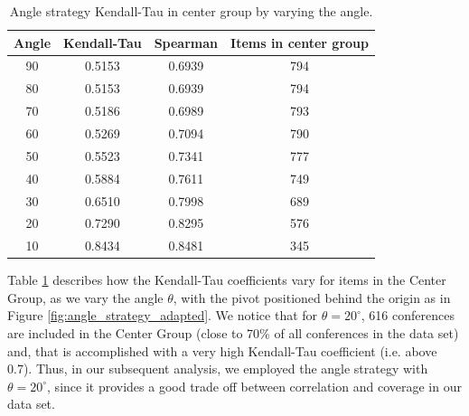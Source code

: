 \documentclass[notitlepage]{svjour3}
\begin{document}
\begin{table}[ht!]
\centering
 \begin{tabular}{c c c c} 
 \toprule
 Angle & Kendall-Tau & Spearman & Items in center group \\ 
 \midrule
 90 & 0.5153 & 0.6939 & 794 \\ 
 80 & 0.5153 & 0.6939 & 794 \\
 70 & 0.5186 & 0.6989 & 793 \\
 60 & 0.5269 & 0.7094 & 790 \\
 50 & 0.5523 & 0.7341 & 777 \\
 40 & 0.5884 & 0.7611 & 749 \\
 30 & 0.6510 & 0.7998 & 689 \\
 20 & 0.7290 & 0.8295 & 576 \\
 10 & 0.8434 & 0.8481 & 345 \\
 \bottomrule
 \end{tabular}
 \caption{Angle strategy Kendall-Tau in center group by varying the angle.}
 \label{tab:angle_strategy}
\end{table}

Table \ref{tab:angle_strategy} describes how the Kendall-Tau coefficients vary for items 
in the Center Group, as we vary the angle $ \theta $, with the pivot positioned behind 
the origin as in Figure \ref{fig:angle_strategy_adapted}. We notice that for $ \theta = 20^{\circ} $, 
616 conferences are included in the Center
Group (close to 70\% of all conferences in the data set) and, that is accomplished with a very high Kendall-Tau 
coefficient (i.e. above 0.7). Thus, in our subsequent 
analysis, we employed the angle strategy with $ \theta = 20^{\circ} $, since it provides 
a good trade off between correlation and coverage in our data set.
\end{document}
